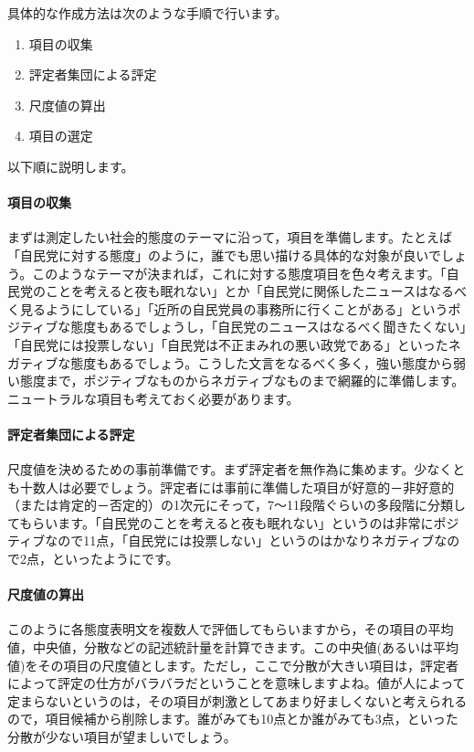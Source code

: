 \documentclass{ltjsbook}
\begin{document}
具体的な作成方法は次のような手順で行います。
\begin{enumerate}
    \item 項目の収集
    \item 評定者集団による評定
    \item 尺度値の算出
    \item 項目の選定
\end{enumerate}

以下順に説明します。
\paragraph{項目の収集}まずは測定したい社会的態度のテーマに沿って，項目を準備します。たとえば「自民党に対する態度」のように，誰でも思い描ける具体的な対象が良いでしょう。このようなテーマが決まれば，これに対する態度項目を色々考えます。「自民党のことを考えると夜も眠れない」とか「自民党に関係したニュースはなるべく見るようにしている」「近所の自民党員の事務所に行くことがある」というポジティブな態度もあるでしょうし，「自民党のニュースはなるべく聞きたくない」「自民党には投票しない」「自民党は不正まみれの悪い政党である」といったネガティブな態度もあるでしょう。こうした文言をなるべく多く，強い態度から弱い態度まで，ポジティブなものからネガティブなものまで網羅的に準備します。ニュートラルな項目も考えておく必要があります。

\paragraph{評定者集団による評定}尺度値を決めるための事前準備です。まず評定者を無作為に集めます。少なくとも十数人は必要でしょう。評定者には事前に準備した項目が好意的－非好意的（または肯定的－否定的）の1次元にそって，7〜11段階ぐらいの多段階に分類してもらいます。「自民党のことを考えると夜も眠れない」というのは非常にポジティブなので11点，「自民党には投票しない」というのはかなりネガティブなので2点，といったようにです。

\paragraph{尺度値の算出}このように各態度表明文を複数人で評価してもらいますから，その項目の平均値，中央値，分散などの記述統計量を計算できます。この中央値(あるいは平均値)をその項目の尺度値とします。ただし，ここで分散が大きい項目は，評定者によって評定の仕方がバラバラだということを意味しますよね。値が人によって定まらないというのは，その項目が刺激としてあまり好ましくないと考えられるので，項目候補から削除します。誰がみても10点とか誰がみても3点，といった分散が少ない項目が望ましいでしょう。
\end{document}
